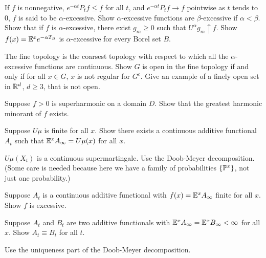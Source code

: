 \begin{exercise}\label{ex:ch2_26}
If $f$ is nonnegative, $e^{-\alpha t}P_tf \leq f$ for all $t$, and $e^{-\alpha t}P_tf \to f$ pointwise as $t$ tends to $0$, $f$ is said to be $\alpha$-excessive. Show $\alpha$-excessive functions are $\beta$-excessive if $\alpha < \beta$. Show that if $f$ is $\alpha$-excessive, there exist $g_m \geq 0$ such that $U^\alpha g_m \uparrow f$. Show $f(x) = \E^xe^{-\alpha T_B}$ is $\alpha$-excessive for every Borel set $B$.
\end{exercise}

\begin{exercise}\label{ex:ch2_27}
The fine topology is the coarsest topology with respect to which all the $\alpha$-excessive functions are continuous. Show $G$ is open in the fine topology if and only if for all $x \in G$, $x$ is not regular for $G^c$. Give an example of a finely open set in $\R^d$, $d \geq 3$, that is not open.
\end{exercise}

\begin{exercise}\label{ex:ch2_28}
Suppose $f > 0$ is superharmonic on a domain $D$. Show that the greatest harmonic minorant of $f$ exists.
\end{exercise}

\begin{exercise}\label{ex:ch2_29}
Suppose $U\mu$ is finite for all $x$. Show there exists a continuous additive functional $A_t$ such that $\E^xA_\infty = U\mu(x)$ for all $x$.

\hint $U\mu(X_t)$ is a continuous supermartingale. Use the Doob-Meyer decomposition. (Some care is needed because here we have a family of probabilities $\{\P^x\}$, not just one probability.)
\end{exercise}

\begin{exercise}\label{ex:ch2_30}
Suppose $A_t$ is a continuous additive functional with $f(x) = \E^xA_\infty$ finite for all $x$. Show $f$ is excessive.
\end{exercise}

\begin{exercise}\label{ex:ch2_31}
Suppose $A_t$ and $B_t$ are two additive functionals with $\E^xA_\infty = \E^xB_\infty < \infty$ for all $x$. Show $A_t \equiv B_t$ for all $t$.

\hint Use the uniqueness part of the Doob-Meyer decomposition.
\end{exercise}

